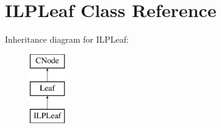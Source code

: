 \hypertarget{classILPLeaf}{\section{\-I\-L\-P\-Leaf \-Class \-Reference}
\label{classILPLeaf}
}
\-Inheritance diagram for \-I\-L\-P\-Leaf\-:\begin{figure}[H]
\begin{center}
\leavevmode
\includegraphics[height=3.000000cm]{classILPLeaf}
\end{center}
\end{figure}
